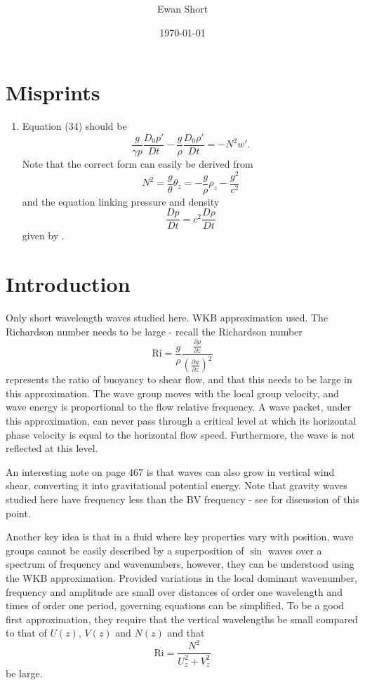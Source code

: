 \documentclass[12pt]{article}
\title{\citet{bretherton66}}
\author{Ewan Short}
\date{\today}
\begin{document}
\maketitle

\section{Misprints}
\begin{enumerate}
\item
Equation (34) should be $$\frac{g}{\gamma p} \frac{D_0 p'}{Dt} - \frac{g}{\rho}\frac{D_0 \rho'}{Dt} = -N^2 w'.$$
Note that the correct form can easily be derived from 
$$N^2 = \frac{g}{\theta}\theta_z =  -\frac{g}{\rho}\rho_z - \frac{g^2}{c^2}$$
and the equation linking pressure and density
$$ \frac{D p}{D t} = c^2 \frac{D \rho}{D t}$$
given by \citet[p. 292]{lighthill78}.
\end{enumerate}

\section{Introduction}
Only short wavelength waves studied here. WKB approximation used. The Richardson number needs to be large - recall the Richardson number
\begin{equation}
\text{Ri} = \frac{g}{\rho}\frac{\frac{\partial \rho}{\partial z}}{(\frac{\partial	u}{\partial z})^2}
\end{equation}
represents the ratio of buoyancy to shear flow, and that this needs to be large in this approximation. The wave group moves with the local group velocity, and wave energy is proportional to the flow relative frequency. A wave packet, under this approximation, can never pass through a critical level at which its horizontal phase velocity is equal to the horizontal flow speed. Furthermore, the wave is not reflected at this level. 

An interesting note on page 467 is that waves can also grow in vertical wind shear, converting it into gravitational potential energy. Note that gravity waves studied here have frequency less than the BV frequency - see \citet{lighthill78} for discussion of this point. 

Another key idea is that in a fluid where key properties vary with position, wave groups cannot be easily described by a superposition of $\sin$ waves over a spectrum of frequency and wavenumbers, however, they can be understood using the WKB approximation. Provided variations in the local dominant wavenumber, frequency and amplitude are small over distances of order one wavelength and times of order one period, governing equations can be simplified. To be a good first approximation, they require that the vertical wavelengths be small compared to that of $U(z)$, $V(z)$ and $N(z)$ and that
\begin{equation}
\text{Ri} = \frac{N^2}{U_z^2+V_z^2}
\end{equation}
be large. 
\end{document}
